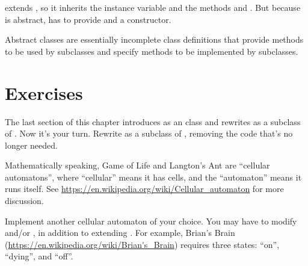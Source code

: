  extends , so it inherits the instance variable  and the methods  and .
But because  is abstract,  has to provide  and a constructor.

Abstract classes are essentially incomplete class definitions that provide methods to be used by subclasses and specify methods to be implemented by subclasses.


\section{Exercises}

\begin{exercise}
The last section of this chapter introduces  as an  class and rewrites  as a subclass of .
Now it's your turn.
Rewrite  as a subclass of , removing the code that's no longer needed.

\end{exercise}


\begin{exercise}

Mathematically speaking, Game of Life and Langton's Ant are ``cellular automatons'', where
``cellular'' means it has cells, and the ``automaton'' means it runs itself.
See \url{https://en.wikipedia.org/wiki/Cellular_automaton} for more discussion.

Implement another cellular automaton of your choice.
You may have to modify  and/or , in addition to extending .
For example, Brian's Brain (\url{https://en.wikipedia.org/wiki/Brian's_Brain}) requires three states: ``on'', ``dying'', and ``off''.

\end{exercise}

